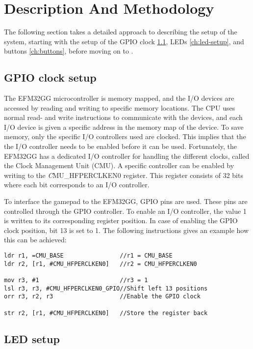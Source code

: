 \section{Description And Methodology}

The following section takes a detailed approach to describing the setup of the system, starting with the setup of the GPIO clock \ref{ch:initial_setup}, LEDs \ref{ch:led-setup}, and buttons \ref{ch:buttons}, before moving on to .


\subsection{GPIO clock setup} \label{ch:initial_setup}
The EFM32GG microcontroller is memory mapped, and the I/O devices are accessed by reading and writing to specific memory locations. The CPU uses normal read- and write instructions to communicate with the devices, and each I/O device is given a specific address in the memory map of the device. To save memory, only the specific I/O controllers used are clocked. This implies that the the I/O controller needs to be enabled before it can be used. Fortunately, the EFM32GG has a dedicated I/O controller for handling the different clocks, called the Clock Management Unit (CMU). A specific controller can be enabled by writing to the \emph CMU\_HFPERCLKEN0 register. This register consists of 32 bits where each bit corresponds to an I/O controller.

To interface the gamepad to the EFM32GG, GPIO pins are used. These pins are controlled through the GPIO controller. To enable an I/O controller, the value 1 is written to its corresponding register position. In case of enabling the GPIO clock position, bit 13 is set to 1. The following instructions gives an example how this can be achieved: 

\begin{lstlisting}
ldr r1, =CMU_BASE                //r1 = CMU_BASE
ldr r2, [r1, #CMU_HFPERCLKEN0]   //r2 = CMU_HFPERCLKEN0 

mov r3, #1                       //r3 = 1
lsl r3, r3, #CMU_HFPERCLKEN0_GPIO//Shift left 13 positions
orr r3, r2, r3                   //Enable the GPIO clock

str r2, [r1, #CMU_HFPERCLKEN0]   //Store the register back 
\end{lstlisting}

\subsection{LED setup}\label{led-setup}

